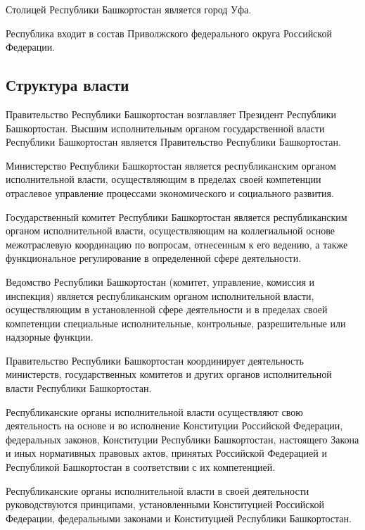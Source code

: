 Столицей Республики Башкортостан является город Уфа.

Республика входит в состав Приволжского федерального округа Российской Федерации.

\subsection{Структура власти}

Правительство  Республики  Башкортостан  возглавляет Президент
Республики Башкортостан.
     Высшим    исполнительным    органом   государственной   власти
Республики    Башкортостан    является   Правительство   Республики
Башкортостан.


Министерство  Республики Башкортостан является республиканским
органом  исполнительной  власти,  осуществляющим  в  пределах своей
компетенции   отраслевое  управление  процессами  экономического  и
социального развития.
     
     
Государственный   комитет   Республики  Башкортостан  является
республиканским  органом  исполнительной  власти, осуществляющим на
коллегиальной   основе   межотраслевую   координацию  по  вопросам,
отнесенным  к  его  ведению, а также функциональное регулирование в
определенной сфере деятельности.
    
Ведомство   Республики   Башкортостан   (комитет,  управление,
комиссия    и    инспекция)    является   республиканским   органом
исполнительной   власти,   осуществляющим   в  установленной  сфере
деятельности   и   в   пределах   своей   компетенции   специальные
исполнительные, контрольные, разрешительные или надзорные функции.
     
     
Правительство     Республики     Башкортостан     координирует
деятельность   министерств,   государственных  комитетов  и  других
органов исполнительной власти Республики Башкортостан.


Республиканские   органы  исполнительной  власти  осуществляют
свою  деятельность на основе и во исполнение Конституции Российской
Федерации,     федеральных    законов,    Конституции    Республики
Башкортостан,  настоящего Закона и иных нормативных правовых актов,
принятых   Российской   Федерацией  и  Республикой  Башкортостан  в
соответствии с их компетенцией.

Республиканские   органы   исполнительной   власти   в   своей
деятельности     руководствуются     принципами,     установленными
Конституцией   Российской   Федерации,   федеральными   законами  и
Конституцией Республики Башкортостан.


